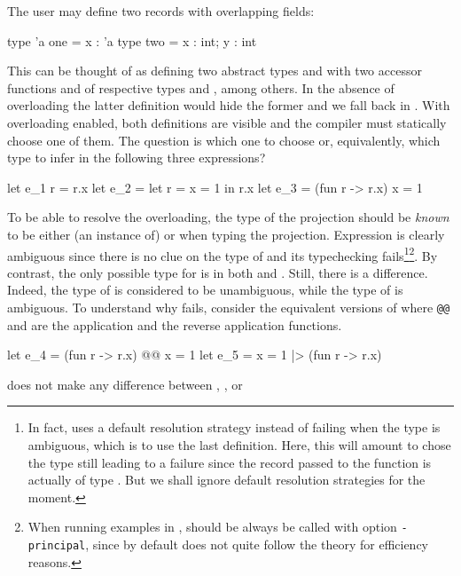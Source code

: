 \documentclass[acmsmall,screen,nonacm]{acmart}
\begin{document}
The user may define two records with overlapping fields:
\begin{program}[input]
type 'a one = {x : 'a}
type two = {x : int; y : int}
\end{program}
This can be thought of as defining two abstract types  and
 with two accessor functions  and
 of respective types  and
, among others.
%
In the absence of overloading the latter definition would hide the former
and we fall back in \ML. With overloading enabled, both definitions are
visible and the compiler must statically choose one of them.
%
The question is which one to choose or, equivalently, which type to infer
in the following three expressions?
\begin{program}[input]
let e_1 r = r.x
let e_2 = let r = {x = 1} in r.x
let e_3 = (fun r -> r.x) {x = 1}
\end{program}
To be able to resolve the overloading, the type of the projection should be
\emph{known} to be either (an instance of)  or 
when typing the projection.  Expression  is clearly
ambiguous since there is no clue on the type of  and its
typechecking fails\footnote {In fact, \OCaml uses a default resolution
strategy instead of failing when the type is ambiguous, which is to use the
last definition. Here, this will amount to chose the type 
still leading to a failure since the record passed to the function is
actually of type . But we shall ignore default resolution
strategies for the moment.}\footnote {When running examples in \OCaml,
\OCaml should be always be called with option \texttt{-principal}, since by
default \OCaml does not quite follow the theory for efficiency reasons.}.
%
By contrast, the only possible type for  is  in both
 and .  Still, there is a difference.  Indeed, the
type of  is considered to be unambiguous, while the type of
 is ambiguous.
%
To understand why  fails, consider the equivalent versions of
 where \texttt{@@} and \ocaml{|>} are the application and the
reverse application functions.
\begin{program}[input,escapechar={}]
let e_4 = (fun r -> r.x) @@ {x = 1}
let e_5 = {x = 1} |> (fun r -> r.x)
\end{program}
\OCaml  does not make any difference between
, , or 
\end{document}
